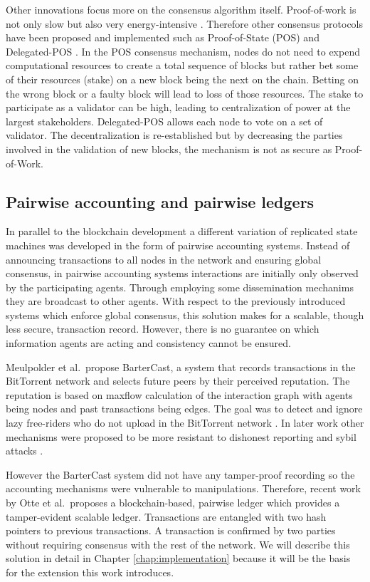 Other innovations focus more on the consensus algorithm itself. Proof-of-work is not only slow but
also very energy-intensive \cite{bitcoin_energy}. Therefore other consensus protocols have been 
proposed and implemented such as Proof-of-State (POS) and Delegated-POS \cite{bentov2016cryptocurrencies, kiayias2017ouroboros}.
In the POS consensus mechanism, nodes do not need to expend computational resources to create a 
total sequence of blocks but rather bet some of their resources (stake) on a new block being the
next on the chain. Betting on the wrong block or a faulty block will lead to loss of those resources.
The stake to participate as a validator can be high, leading to centralization of power at the largest
stakeholders. Delegated-POS allows each node to vote on a set of validator. The decentralization is
re-established but by decreasing the parties involved in the validation of new blocks, the mechanism
is not as secure as Proof-of-Work.

\subsection{Pairwise accounting and pairwise ledgers}
In parallel to the blockchain development a different variation of replicated state machines was 
developed in the form of pairwise accounting systems. Instead of announcing transactions to all 
nodes in the network and ensuring global consensus, in pairwise accounting systems interactions are
initially only observed by the participating agents. Through employing some dissemination mechanims they are
broadcast to other agents. With respect to the previously introduced systems which enforce global 
consensus, this solution makes for a scalable, though less secure, transaction record. However, there is no 
guarantee on which information agents are acting and consistency cannot be ensured.

Meulpolder et al.\ propose BarterCast, a system that records transactions in the BitTorrent network
and selects future peers by their perceived reputation. The reputation is based on maxflow 
calculation of the interaction graph with agents being nodes and past transactions being edges. The
goal was to detect and ignore lazy free-riders who do not upload in the BitTorrent network \cite{meulpolder2009bartercast}.
In later work other mechanisms were proposed to be more resistant to dishonest reporting and sybil
attacks \cite{seuken2010accounting, seuken2014sybil}.

However the BarterCast system did not have any tamper-proof recording so the accounting mechanisms were
vulnerable to manipulations. Therefore, recent work by Otte et al.\ proposes a blockchain-based, pairwise
ledger which provides a tamper-evident scalable ledger. Transactions are 
entangled with two hash pointers to previous transactions. A transaction is confirmed by two parties
without requiring consensus with the rest of the network. We will describe this solution in detail 
in Chapter \ref{chap:implementation} because it will be the basis for the extension this work
introduces. 

